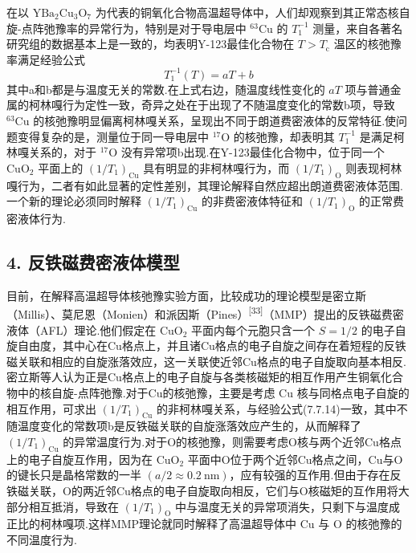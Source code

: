 在以 $\mathrm{YBa}_{2}\mathrm{Cu}_{3}\mathrm{O}_{7}$ 为代表的铜氧化合物高温超导体中，人们却观察到其正常态核自旋-点阵弛豫率的异常行为，特别是对于导电层中 $^{63}\mathrm{Cu}$ 的 $T_{1}^{-1}$ 测量，来自各著名研究组的数据基本上是一致的，均表明Y-123最佳化合物在 $T>T_{\mathrm{c}}$ 温区的核弛豫率满足经验公式
\begin{equation}
  T_{1}^{-1}(T)=aT+b
\end{equation}
其中a和b都是与温度无关的常数.在上式右边，随温度线性变化的 $aT$ 项与普通金属的柯林嘎行为定性一致，奇异之处在于出现了不随温度变化的常数b项，导致 $^{63}\mathrm{Cu}$ 的核弛豫明显偏离柯林嘎关系，呈现出不同于朗道费密液体的反常特征.使问题变得复杂的是，测量位于同一导电层中 $^{17}\mathrm{O}$ 的核弛豫，却表明其 $T_{1}^{-1}$ 是满足柯林嘎关系的，对于 $^{17}\mathrm{O}$ 没有异常项b出现.在Y-123最佳化合物中，位于同一个 $\mathrm{CuO}_{2}$ 平面上的 $\left(1/T_{1}\right)_{\mathrm{Cu}}$ 具有明显的非柯林嘎行为，而 $\left(1/T_{1}\right)_{\mathrm{O}}$ 则表现柯林嘎行为，二者有如此显著的定性差别，其理论解释自然应超出朗道费密液体范围.一个新的理论必须同时解释 $\left(1/T_{1}\right)_{\mathrm{Cu}}$ 的非费密液体特征和 $\left(1/T_{1}\right)_{\mathrm{O}}$ 的正常费密液体行为.

\subsection*{4. 反铁磁费密液体模型}

目前，在解释高温超导体核弛豫实验方面，比较成功的理论模型是密立斯（Millis）、莫尼恩（Monien）和派因斯（Pines）\textsuperscript{[33]}（MMP）提出的反铁磁费密液体（AFL）理论.他们假定在 $\mathrm{CuO}_{2}$ 平面内每个元胞只含一个 $S=1/2$ 的电子自旋自由度，其中心在Cu格点上，并且诸Cu格点的电子自旋之间存在着短程的反铁磁关联和相应的自旋涨落效应，这一关联使近邻Cu格点的电子自旋取向基本相反.密立斯等人认为正是Cu格点上的电子自旋与各类核磁矩的相互作用产生铜氧化合物中的核自旋-点阵弛豫.对于Cu的核弛豫，主要是考虑 Cu 核与同格点电子自旋的相互作用，可求出 $\left(1/T_{1}\right)_{\mathrm{Cu}}$ 的非柯林嘎关系，与经验公式(7.7.14)一致，其中不随温度变化的常数项b是反铁磁关联的自旋涨落效应产生的，从而解释了 $\left(1/T_{1}\right)_{\mathrm{Cu}}$ 的异常温度行为.对于O的核弛豫，则需要考虑O核与两个近邻Cu格点上的电子自旋互作用，因为在 $\mathrm{CuO}_{2}$ 平面中O位于两个近邻Cu格点之间，Cu与O的键长只是晶格常数的一半 $\left(a/2\approx0.2\ \mathrm{nm}\right)$，应有较强的互作用.但由于存在反铁磁关联，O的两近邻Cu格点的电子自旋取向相反，它们与O核磁矩的互作用将大部分相互抵消，导致在 $\left(1/T_{1}\right)_{\mathrm{O}}$ 中与温度无关的异常项消失，只剩下与温度成正比的柯林嘎项.这样MMP理论就同时解释了高温超导体中 Cu 与 O 的核弛豫的不同温度行为.

